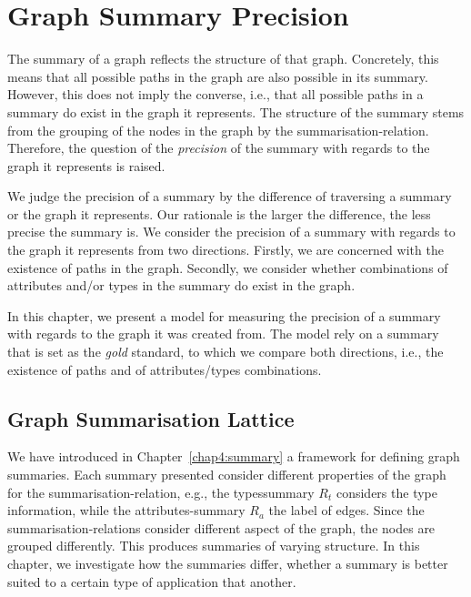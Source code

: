 \chapter{Graph Summary Precision}
\label{chap03:sec:quality}

The summary of a graph reflects the structure of that graph. Concretely, this means that all possible paths in the graph are also possible in its summary. However, this does not imply the converse, i.e., that all possible paths in a summary do exist in the graph it represents. The structure of the summary stems from the grouping of the nodes in the graph by the \gls{summarisation-relation}. Therefore, the question of the \emph{precision} of the summary with regards to the graph it represents is raised.

We judge the precision of a summary by the difference of traversing a summary or the graph it represents. Our rationale is the larger the difference, the less precise the summary is. We consider the precision of a summary with regards to the graph it represents from two directions. Firstly, we are concerned with the existence of paths in the graph. Secondly, we consider whether combinations of \gls{attributes} and/or \gls{types} in the summary do exist in the graph.

In this chapter, we present a model for measuring the precision of a summary with regards to the graph it was created from. The model rely on a summary that is set as the \emph{gold} standard, to which we compare both directions, i.e., the existence of paths and of \gls{attributes}/\gls{types} combinations.

\section{Graph Summarisation Lattice}

We have introduced in Chapter~\ref{chap4:summary} a framework for defining graph summaries. Each summary presented consider different properties of the graph for the \gls{summarisation-relation}, e.g., the \gls{typessummary} $R_t$ considers the type information, while the \gls{attributes-summary} $R_a$ the label of edges. Since the \glspl{summarisation-relation} consider different aspect of the graph, the nodes are grouped differently. This produces summaries of varying structure. In this chapter, we investigate how the summaries differ, whether a summary is better suited to a certain type of application that another.

